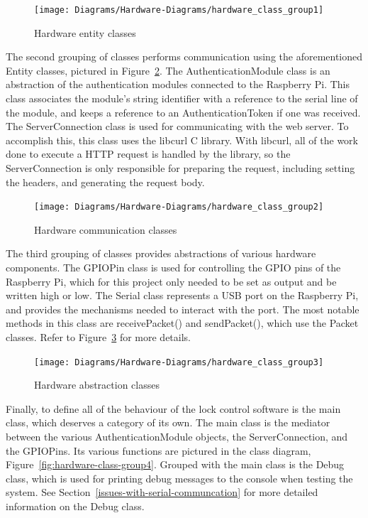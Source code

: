 \documentclass[12pt]{report}
\begin{document}
\begin{figure}
    \texttt{[image: Diagrams/Hardware-Diagrams/hardware\_class\_group1]}
    \caption{Hardware entity classes}
    \label{fig:hardware-class-group1}
\end{figure}

The second grouping of classes performs communication using the aforementioned Entity classes, pictured in 
Figure~\ref{fig:hardware-class-group2}. The AuthenticationModule 
class is an abstraction of the authentication modules connected to the Raspberry Pi. This class associates the module's 
string identifier with a reference to the serial line of the module, and keeps a reference to an AuthenticationToken if 
one was received. The ServerConnection class is used for communicating with the web server. To accomplish this, this 
class uses the libcurl C library. With libcurl, all of the work done to execute a HTTP request is handled by the 
library, so the ServerConnection is only responsible for preparing the request, including setting the headers, and 
generating the request body.

\begin{figure}
    \centering
    \texttt{[image: Diagrams/Hardware-Diagrams/hardware\_class\_group2]}
    \caption{Hardware communication classes}
    \label{fig:hardware-class-group2}
\end{figure}

The third grouping of classes provides abstractions of various hardware components. The GPIOPin class is used for 
controlling the GPIO pins of the Raspberry Pi, which for this project only needed to be set as output and be written 
high or low. The Serial class represents a USB port on the Raspberry Pi, and provides the mechanisms needed to interact 
with the port. The most notable methods in this class are receivePacket() and sendPacket(), which use the Packet 
classes. Refer to Figure~\ref{fig:hardware-class-group3} for more details.

\begin{figure}
    \texttt{[image: Diagrams/Hardware-Diagrams/hardware\_class\_group3]}
    \caption{Hardware abstraction classes}
    \label{fig:hardware-class-group3}
\end{figure}

Finally, to define all of the behaviour of the lock control software is the main class, which deserves a category of 
its own. The main class is the mediator between the various AuthenticationModule objects, the ServerConnection, and the 
GPIOPins. Its various functions are pictured in the class diagram, Figure~\ref{fig:hardware-class-group4}. Grouped with 
the main class is the Debug class, which is used for printing debug messages to the console when testing the system. 
See Section~\ref{issues-with-serial-communcation} for more detailed information on the Debug class.
\end{document}
